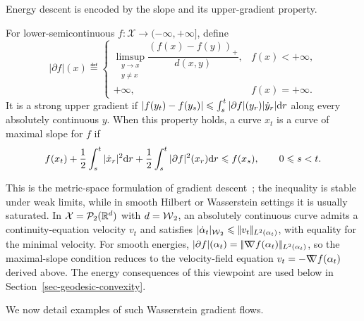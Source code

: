 Energy descent is encoded by the slope and its upper-gradient property.
\begin{defn}\label{def-curve-maximal-slope}
For lower-semicontinuous $f:\mathcal X\to(-\infty,+\infty]$, define
		\[
		|\partial f|(x)
		\eqdef
		\begin{cases}
		\limsup_{\substack{y\to x\\ y\neq x}}
			\dfrac{( f(x)-f(y) )_+}{d(x,y)}, & f(x)<+\infty,\\[.4em]
		+\infty, & f(x)=+\infty.
		\end{cases}
		\]
It is a strong upper gradient if $|f(y_t)-f(y_s)|\leqslant \int_s^t |\partial f|(y_r)|\dot y_r|\mathrm{d} r$ along every absolutely continuous $y$. When this property holds, a curve $x_t$ is a curve of maximal slope for $f$ if
	\[
		f(x_t)
		+\frac12\int_s^t |\dot x_r|^2\mathrm{d} r
		+\frac12\int_s^t |\partial f|^2(x_r)\mathrm{d} r
		\leqslant f(x_s),
			\qquad 0\leqslant s<t.
		\]
\end{defn}
This is the metric-space formulation of gradient descent~\cite{ambrosio2006gradient}; the inequality is stable under weak limits, while in smooth Hilbert or Wasserstein settings it is usually saturated. In $\mathcal X=\mathcal{P}_2(\mathbb{R}^d)$ with $d=\operatorname{\mathcal{W}}_2$, an absolutely continuous curve admits a continuity-equation velocity $v_t$ and satisfies $|\dot\alpha_t|_{\operatorname{\mathcal{W}}_2}\leqslant|\!| v_t |\!|_{L^2(\alpha_t)}$, with equality for the minimal velocity. For smooth energies, $|\partial f|(\alpha_t)=|\!| \mathord{\nabla\mkern-9.3mu\nabla} f(\alpha_t) |\!|_{L^2(\alpha_t)}$, so the maximal-slope condition reduces to the velocity-field equation $v_t=-\mathord{\nabla\mkern-9.3mu\nabla} f(\alpha_t)$ derived above. The energy consequences of this viewpoint are used below in Section~\ref{sec-geodesic-convexity}.

We now detail examples of such Wasserstein gradient flows.


